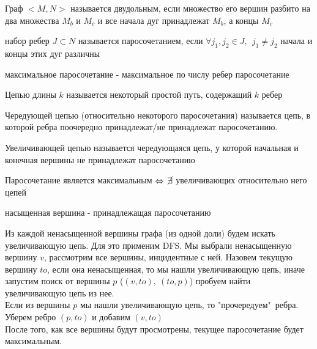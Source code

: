 \documentclass[discrete.tex]{subfiles}
\begin{document}
\begin{definition}
    Граф $<M, N>$ называется двудольным, если множество его вершин разбито на два 
    множества $M_b$ и $M_c$ и все начала дуг принадлежат $M_b$, а концы $M_c$ 
\end{definition}

\begin{definition}
    набор ребер $J \subset N$ называется паросочетанием, если $\forall j_1, j_2 \in J,\ \  
    j_1 \neq j_2$ начала и концы этих дуг различны
\end{definition}

\begin{definition}
    максимальное паросочетание - максимальное по числу ребер паросочетание
\end{definition}

\begin{definition}
    Цепью длины $k$ называется некоторый простой путь, содержащий $k$ ребер
\end{definition}

\begin{definition}
    Чередующей цепью (относительно некоторого паросочетания) называется цепь, 
    в которой ребра поочередно принадлежат/не принадлежат паросочетанию.
\end{definition}

\begin{definition}
    Увеличивающей цепью называется чередующаяся цепь, у которой начальная и конечная 
    вершины не принадлежат паросочетанию
\end{definition}

\begin{theorem}[Бержа]
    Паросочетание является максимальным $\Leftrightarrow$ $\cancel{\exists }$ увеличивающих  
    относительно него цепей
\end{theorem}

\begin{definition}
    насыщенная вершина - принадлежащая паросочетанию
\end{definition}

\begin{definition}
    Из каждой ненасыщенной вершины графа (из одной доли) будем искать увеличивающую цепь.
    Для это применим DFS. Мы выбрали ненасыщенную вершину $v$, рассмотрим все вершины, 
    инцидентные с ней. Назовем текущую вершину $to$, если она ненасыщенная, то мы 
    нашли увеличивающую цепь, иначе запустим поиск от вершины $p$ ($(v, to), \ (to, p)$)
    пробуем найти увеличивающую цепь из нее.\\
    Если из вершины $p$ мы нашли увеличивающую цепь, то "прочередуем"\ ребра. Уберем 
    ребро $(p, to)$ и добавим $(v, to)$\\
    После того, как все вершины будут просмотрены, текущее паросочетание будет
    максимальным.
\end{definition}
\end{document}
